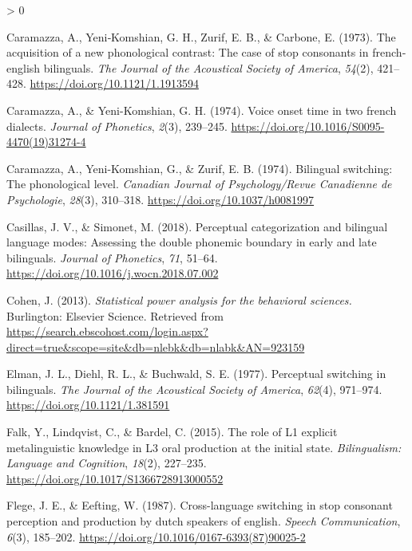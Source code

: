 \documentclass[
  english,
  man]{apa6}
\newlength{\cslhangindent}
\newenvironment{CSLReferences}[2] %
 {%
  \setlength{\parindent}{0pt}
  \ifodd #1 \everypar{\setlength{\hangindent}{\cslhangindent}}\ignorespaces\fi
  \ifnum #2 > 0
  \setlength{\parskip}{#2\baselineskip}
  \fi
 }%
 {}
\begin{document}
\begin{CSLReferences}{1}{0}
\leavevmode\hypertarget{ref-caramazza_acquisition_1973}{}%
Caramazza, A., Yeni‐Komshian, G. H., Zurif, E. B., \& Carbone, E. (1973). The acquisition of a new phonological contrast: The case of stop consonants in french‐english bilinguals. \emph{The Journal of the Acoustical Society of America}, \emph{54}(2), 421--428. \url{https://doi.org/10.1121/1.1913594}

\leavevmode\hypertarget{ref-caramazza_voice_1974}{}%
Caramazza, A., \& Yeni-Komshian, G. H. (1974). Voice onset time in two french dialects. \emph{Journal of Phonetics}, \emph{2}(3), 239--245. \url{https://doi.org/10.1016/S0095-4470(19)31274-4}

\leavevmode\hypertarget{ref-caramazza_bilingual_1974}{}%
Caramazza, A., Yeni-Komshian, G., \& Zurif, E. B. (1974). Bilingual switching: The phonological level. \emph{Canadian Journal of Psychology/Revue Canadienne de Psychologie}, \emph{28}(3), 310--318. \url{https://doi.org/10.1037/h0081997}

\leavevmode\hypertarget{ref-casillas_perceptual_2018}{}%
Casillas, J. V., \& Simonet, M. (2018). Perceptual categorization and bilingual language modes: Assessing the double phonemic boundary in early and late bilinguals. \emph{Journal of Phonetics}, \emph{71}, 51--64. \url{https://doi.org/10.1016/j.wocn.2018.07.002}

\leavevmode\hypertarget{ref-cohen_statistical_2013}{}%
Cohen, J. (2013). \emph{Statistical power analysis for the behavioral sciences.} Burlington: Elsevier Science. Retrieved from \url{https://search.ebscohost.com/login.aspx?direct=true\&scope=site\&db=nlebk\&db=nlabk\&AN=923159}

\leavevmode\hypertarget{ref-elman_perceptual_1977}{}%
Elman, J. L., Diehl, R. L., \& Buchwald, S. E. (1977). Perceptual switching in bilinguals. \emph{The Journal of the Acoustical Society of America}, \emph{62}(4), 971--974. \url{https://doi.org/10.1121/1.381591}

\leavevmode\hypertarget{ref-falk_role_2015}{}%
Falk, Y., Lindqvist, C., \& Bardel, C. (2015). The role of L1 explicit metalinguistic knowledge in L3 oral production at the initial state. \emph{Bilingualism: Language and Cognition}, \emph{18}(2), 227--235. \url{https://doi.org/10.1017/S1366728913000552}

\leavevmode\hypertarget{ref-flege_cross-language_1987}{}%
Flege, J. E., \& Eefting, W. (1987). Cross-language switching in stop consonant perception and production by dutch speakers of english. \emph{Speech Communication}, \emph{6}(3), 185--202. \url{https://doi.org/10.1016/0167-6393(87)90025-2}


\end{CSLReferences}
\end{document}
